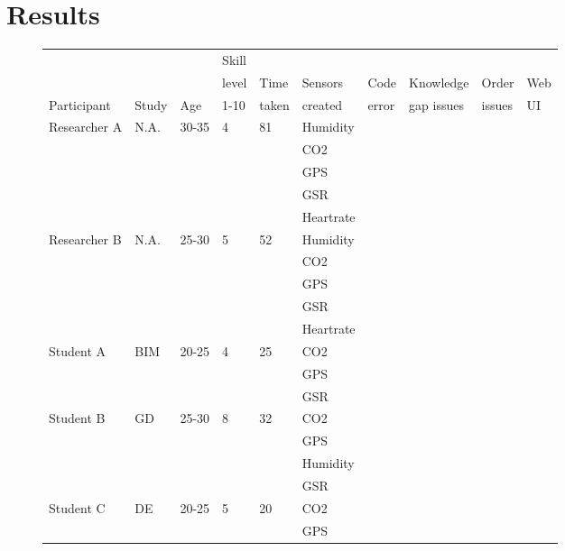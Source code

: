 \documentclass[conference]{IEEEtran}
\begin{document}
\section{Results}
		\begin{figure*}[ht]
			\centering
			\begin{tabular}{ | l | l | l | l | l | l | l | l | l | l | }
				\hline
							& 				& 		& Skill	& 		& 			& 		& 				& 		& 		\\ 
							& 				& 		& level	& Time	& Sensors	& Code 	& Knowledge		& Order & Web	\\ 
			Participant		& Study			& Age	& 1-10	& taken	& created	& error & gap issues	& issues& UI\\ \hline \hline
			Researcher A	& N.A.			& 30-35 & 4		& 81	& Humidity	& 		& 				& 		&		\\ 
							& 				& 		& 		& 		& CO2		& 		& 				& 		& 		\\ 
							& 				& 		& 		& 		& GPS		& 		& 				& 		& 		\\
							& 				& 		& 		& 		& GSR		& 		& 				& 		& 		\\
							& 				& 		& 		& 		& Heartrate	& 		& 				& 		& 		\\ \hline
			Researcher B	& N.A.			& 25-30 & 5 	& 52	& Humidity	& 		& 				& 		& 		\\ 
							& 				& 		& 		& 		& CO2		& 		& 				& 		& 		\\
							& 				& 		& 		& 		& GPS		& 		& 				& 		& 		\\
							& 				& 		& 		& 		& GSR		& 		& 				& 		& 		\\
							& 				& 		& 		& 		& Heartrate	& 		& 				& 		& 		\\ \hline
			Student A		& BIM	& 20-25 & 4 	& 25	& CO2 		& 		& 				& 		& 		\\
							& 				& 		& 	 	& 		& GPS		& 		& 				& 		& 		\\
							& 				& 		& 	 	& 		& GSR		& 		& 				& 		& 		\\ \hline
			Student B		& GD 			& 25-30 & 8 	& 32	& CO2		& 		& 				& 		& 		\\
							& 				& 		& 		& 		& GPS		& 		& 				& 		& 		\\
							& 				& 		& 		& 		& Humidity	& 		& 				& 		& 		\\
							& 				& 		& 		& 		& GSR		& 		& 				& 		& 		\\ \hline
			Student C		& DE			& 20-25 & 5		& 20	& CO2		& 		& 				& 		& 		\\ 
							& 				& 		& 		& 		& GPS		& 		& 				& 		& 		\\

\end{tabular}
\end{figure*}
\end{document}
